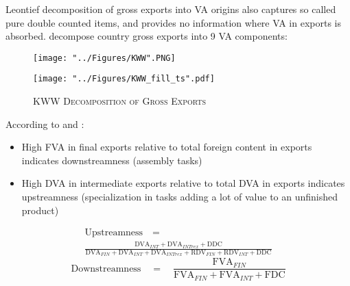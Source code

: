 \documentclass[compress]{beamer}
\begin{document}
\begin{frame}
Leontief decomposition of gross exports into VA origins also captures so called pure double counted items, and provides no information where VA in exports is absorbed. \citet{koopman2014tracing} decompose country gross exports into 9 VA components:

\begin{figure}[h!]
\centering
\texttt{[image: "../Figures/KWW".PNG]} %
\end{figure}
\end{frame}


\begin{frame}
\begin{figure}[h!]
\centering
\caption{\label{fig:KWW_fill_ts}\textsc{KWW Decomposition of Gross Exports}}
\texttt{[image: "../Figures/KWW\_fill\_ts".pdf]} %
\end{figure}
\end{frame}

\begin{frame}
According to \citet{Kummritz20162} and \citet{wang2013quantifying}: \newline

\begin{itemize}
\item High FVA in final exports relative to total foreign content in exports indicates downstreamness (assembly tasks)
\item High DVA in intermediate exports relative to total DVA in exports indicates upstreamness (specialization in tasks adding a lot of value to an unfinished product)
\end{itemize}

\begin{gather*}
\text{Upstreamness}\quad = \\
 \frac{\text{DVA}_{INT} + \text{DVA}_{INTrex} + \text{DDC}}{\text{DVA}_{FIN} + \text{DVA}_{INT} + \text{DVA}_{INTrex} + \text{RDV}_{FIN} + \text{RDV}_{INT} + \text{DDC}}
\end{gather*}
\begin{equation*} 
\text{Downstreamness}\quad =\quad \frac{\text{FVA}_{FIN}}{\text{FVA}_{FIN} + \text{FVA}_{INT} + \text{FDC}}
\end{equation*}
\end{frame}
\end{document}
